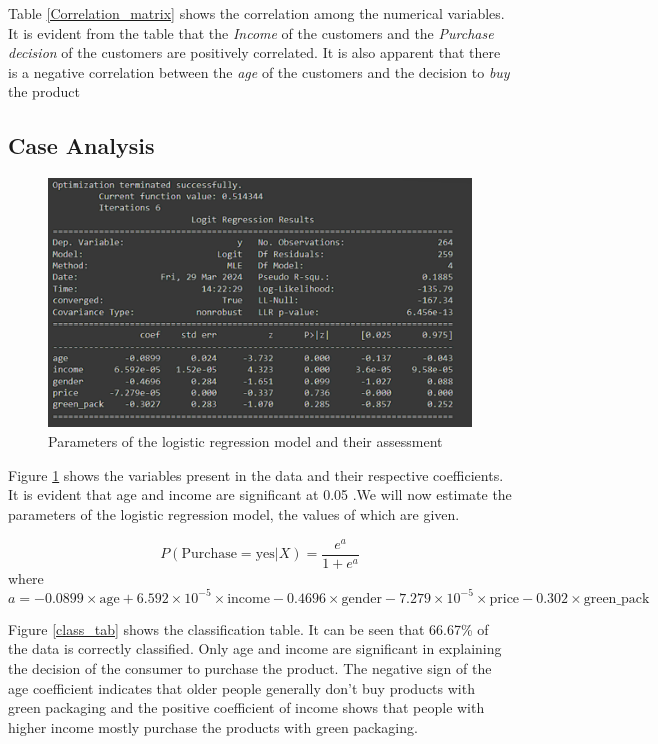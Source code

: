 \documentclass[a4paper,10pt]{article}
\begin{document}
Table \ref{Correlation_matrix} shows the correlation among the numerical variables. It is evident from the table that the \textit{Income} of the customers and the \textit{Purchase decision} of the customers are positively correlated. 
It is also apparent that there is a negative correlation between the \textit{age} of the customers and the decision to \textit{buy} the product



\subsection{Case Analysis}


\begin{figure}[ht]
\centering
\includegraphics[height=6.6cm]{figures/coeff.png}
\caption{Parameters of the logistic regression model and their assessment}
\label{fig_regression}
\label{summary_lr}
\end{figure}

Figure \ref{summary_lr} shows the variables present in the data and their respective coefficients. It is evident that age and income are significant at 0.05 .We will now estimate the parameters of the logistic regression model, the values of which are given.

\begin{equation}
P(\text{Purchase} = \text{yes} | X) = \frac{e^{a}}{1 + e^{a}}
\label{LR_model}
\end{equation}
where
\begin{equation}
a = -0.0899 \times \text{age} + 6.592 \times 10^{-5} \times \text{income} - 0.4696 \times \text{gender} - 7.279 \times 10^{-5} \times \text{price} - 0.302 \times \text{green\_pack}
\label{LR_equation}
\end{equation}

Figure \ref{class_tab} shows the classification table. It can be seen that 66.67\% of the data is correctly classified. Only age and income are significant in explaining the decision of the consumer to purchase the product. The negative sign of the age coefficient indicates that older people generally don't buy products with green packaging and the positive coefficient of income shows that people with higher income mostly purchase the products with green packaging.
\end{document}
